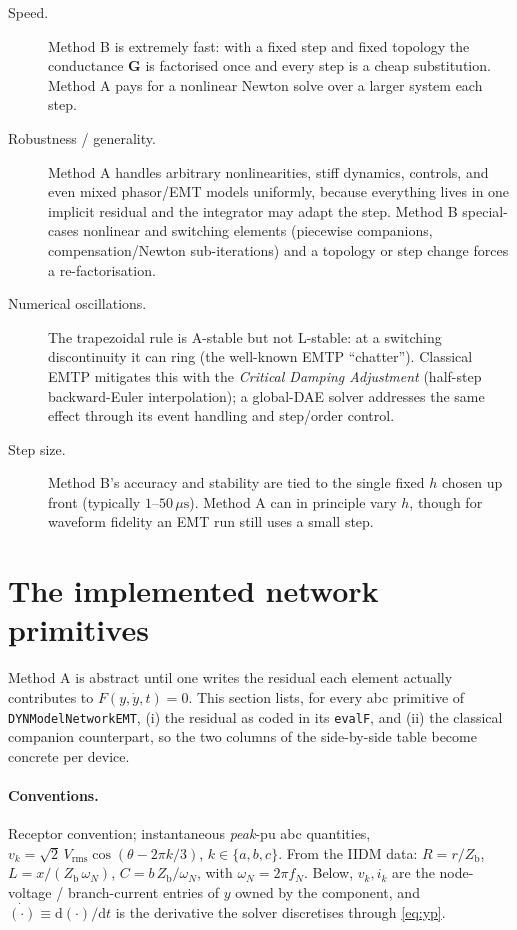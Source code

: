 \documentclass[11pt]{article}
\newcommand{\dd}{\mathrm{d}}
\newcommand{\hstep}{h}
\begin{document}
\begin{description}
\item[Speed.] Method B is extremely fast: with a fixed step and fixed topology
the conductance $\mathbf{G}$ is factorised once and every step is a cheap
substitution. Method A pays for a nonlinear Newton solve over a larger system
each step.

\item[Robustness / generality.] Method A handles arbitrary nonlinearities,
stiff dynamics, controls, and even mixed phasor/EMT models uniformly, because
everything lives in one implicit residual and the integrator may adapt the step.
Method B special-cases nonlinear and switching elements (piecewise companions,
compensation/Newton sub-iterations) and a topology or step change forces a
re-factorisation.

\item[Numerical oscillations.] The trapezoidal rule is A-stable but not
L-stable: at a switching discontinuity it can ring (the well-known EMTP
``chatter''). Classical EMTP mitigates this with the \emph{Critical Damping
Adjustment} (half-step backward-Euler interpolation); a global-DAE solver
addresses the same effect through its event handling and step/order control.

\item[Step size.] Method B's accuracy and stability are tied to the single
fixed $\hstep$ chosen up front (typically $1$--$50\,\mu\mathrm{s}$).
Method A can in principle vary $\hstep$, though for waveform fidelity an EMT run
still uses a small step.
\end{description}

\section{The implemented network primitives}

Method A is abstract until one writes the residual each element actually
contributes to $F(y,\dot y,t)=0$. This section lists, for every
abc primitive of \texttt{DYNModelNetworkEMT}, (i) the residual as coded in its
\texttt{evalF}, and (ii) the classical companion counterpart, so the two columns
of the side-by-side table become concrete per device.

\paragraph{Conventions.} Receptor convention; instantaneous \emph{peak}-pu abc
quantities, $v_k=\sqrt2\,V_{\mathrm{rms}}\cos(\theta-2\pi k/3)$, $k\in\{a,b,c\}$.
From the IIDM data: $R=r/Z_{\mathrm b}$, $L=x/(Z_{\mathrm b}\,\omega_N)$,
$C=b\,Z_{\mathrm b}/\omega_N$, with $\omega_N=2\pi f_N$. Below, $v_k,i_k$ are the
node-voltage / branch-current entries of $y$ owned by the component, and
$\dot{(\cdot)}\equiv\dd(\cdot)/\dd t$ is the derivative the solver discretises
through \eqref{eq:yp}.
\end{document}
